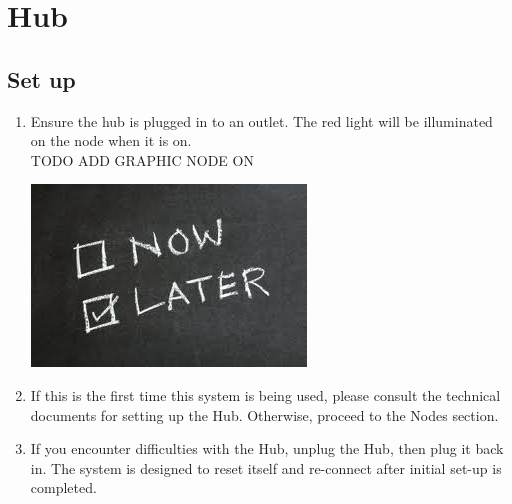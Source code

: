   \section{Hub}
  \subsection{Set up}
    \begin{enumerate}
      \item Ensure the hub is plugged in to an outlet.
      The red light will be illuminated on the node when it is on.\\ 
TODO ADD GRAPHIC NODE ON\\
      \begin{center}
      \includegraphics[scale=1]{images/Now-Later.png}
    \end{center}

      \item If this is the first time this system is being used, please consult
      the technical documents for setting up the Hub.  Otherwise, proceed to the Nodes section.

      \item If you encounter difficulties with the Hub, unplug the Hub, then
       plug it back in.  The system is designed to reset itself and re-connect
       after initial set-up is completed.
    \end{enumerate}

